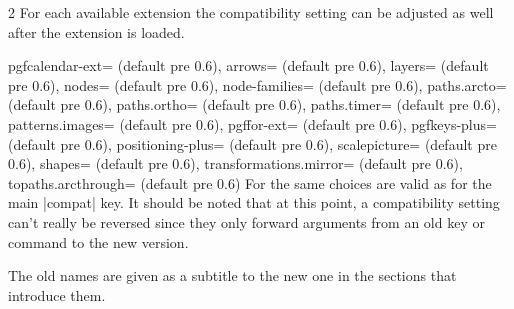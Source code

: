 \begin{multicols}{2}
\newcolumn\noindent
For each available extension the compatibility setting can be adjusted as well
after the extension is loaded.
\begin{keylist}{%
  pgfcalendar-ext= (default pre 0.6),
  arrows= (default pre 0.6),
  layers= (default pre 0.6),
  nodes= (default pre 0.6),
  node-families= (default pre 0.6),
  paths.arcto= (default pre 0.6),
  paths.ortho= (default pre 0.6),
  paths.timer= (default pre 0.6),
  patterns.images= (default pre 0.6),
  pgffor-ext= (default pre 0.6),
  pgfkeys-plus= (default pre 0.6),
  positioning-plus= (default pre 0.6),
  scalepicture= (default pre 0.6),
  shapes= (default pre 0.6),
  transformations.mirror= (default pre 0.6),
  topaths.arcthrough= (default pre 0.6)%
}
  For  the same choices are valid as for the main |compat| key.
  It should be noted that at this point, a compatibility setting can't really be reversed
  since they only forward arguments from an old key or command to the new version.
  
  The old names are given as a subtitle to the new one in the sections that introduce them.
\end{keylist}
\end{multicols}